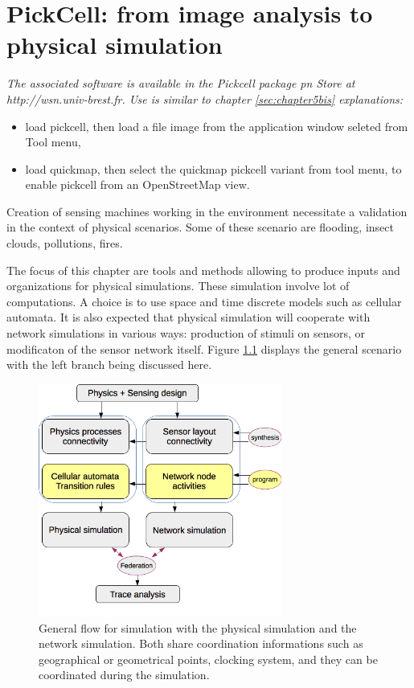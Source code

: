 
\chapter{PickCell: from image analysis to physical simulation} 
 
{\sl The associated software is available in the Pickcell package pn Store at http://wsn.univ-brest.fr.
Use is similar to  chapter  \ref{sec:chapter5bis} explanations: 
\begin{itemize}
\item load pickcell, then load a file image from the application window seleted from Tool menu,
\item load quickmap, then select the quickmap pickcell variant from tool menu, to enable
pickcell from an OpenStreetMap view.
\end{itemize}
}


Creation of sensing machines working in the environment necessitate 
a validation  in the context of physical scenarios. Some of these 
scenario are flooding, insect clouds, pollutions, fires.

The focus of this chapter are tools and methods allowing to produce inputs and  organizations
for physical  simulations. These simulation involve lot of computations. A  choice
is to use  space and time  discrete  models such as
cellular automata. It is also expected that physical simulation  will cooperate with network simulations
in various ways: production of stimuli on sensors, or  modificaton  of the sensor network 
itself. Figure \ref{fig:physics+sensorsFlow} displays the general scenario with
the left branch being discussed here.



\begin{figure}[hbtp]
\begin{center} 
\includegraphics[width=8cm]{physics+sensorsFlow.png}
\caption{General flow for simulation with the physical simulation and the network simulation.
Both share coordination  informations such as geographical or geometrical points, clocking system,
and they can be coordinated during the simulation.}
\label{fig:physics+sensorsFlow}
\end{center}
\end{figure}


